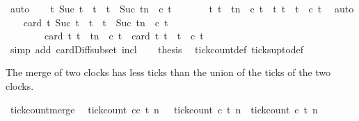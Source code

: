 \begin{isabellebody}
\ auto\isanewline
\ \ \isamarkupfalse%
\ {\isacartoucheopen}{\isacharbraceleft}t{\isachardot}\ {\isacharparenleft}Suc\ t\ {\isasymle}\ t\ {\isasymand}\ t\ {\isacharless}\ {\isacharparenleft}Suc\ tn\ {\isasymand}\ c\ t{\isacharbraceright}\isanewline
\ \ \ \ \ \ {\isacharequal}\ {\isacharbraceleft}t{\isachardot}\ t\ {\isasymle}\ tn\ {\isasymand}\ c\ t{\isacharbraceright}\ {\isacharminus}\ {\isacharbraceleft}t{\isachardot}\ t\ {\isasymle}\ t\ {\isasymand}\ c\ t{\isacharbraceright}{\isacartoucheclose}\ \isamarkupfalse%
\ auto\isanewline
\ \ \isamarkupfalse%
\ {\isacartoucheopen}card\ {\isacharbraceleft}t{\isachardot}\ {\isacharparenleft}Suc\ t\ {\isasymle}\ t\ {\isasymand}\ t\ {\isacharless}\ {\isacharparenleft}Suc\ tn\ {\isasymand}\ c\ t{\isacharbraceright}\isanewline
\ \ \ \ \ \ \ {\isacharequal}\ card\ {\isacharbraceleft}t{\isachardot}\ t\ {\isasymle}\ tn\ {\isasymand}\ c\ t{\isacharbraceright}\ {\isacharminus}\ card\ {\isacharbraceleft}t{\isachardot}\ t\ {\isasymle}\ t\ {\isasymand}\ c\ t{\isacharbraceright}{\isacartoucheclose}\isanewline
\ \ \ \ \isamarkupfalse%
\ {\isacharparenleft}simp\ add{\isacharcolon}\ card{\isacharunderscore}Diff{\isacharunderscore}subset\ incl{\isacharparenright}\isanewline
\ \ \isamarkupfalse%
\ {\isacharquery}thesis\ \isamarkupfalse%
\ tick{\isacharunderscore}count{\isacharunderscore}def\ ticks{\isacharunderscore}up{\isacharunderscore}to{\isacharunderscore}def\ \isacommand{{\isachardot}}\isamarkupfalse%
\isanewline
{}\isamarkupfalse%
%
\endisatagproof
{\isafoldproof}%
%
\isadelimproof
%
\endisadelimproof
%
\begin{isamarkuptext}%
The merge of two clocks has less ticks than the union of the ticks of the two clocks.%
\end{isamarkuptext}\isamarkuptrue%
\isamarkupfalse%
\ tick{\isacharunderscore}count{\isacharunderscore}merge{\isacharcolon}\isanewline
\ \ {\isacartoucheopen}tick{\isacharunderscore}count\ {\isacharparenleft}c{\isasymoplus}c{\isacharprime}{\isacharparenright}\ t\ n\ \ {\isasymle}\ tick{\isacharunderscore}count\ c\ t\ n\ {\isacharplus}\ tick{\isacharunderscore}count\ c{\isacharprime}\ t\ n{\isacartoucheclose}\isanewline

\end{isabellebody}
